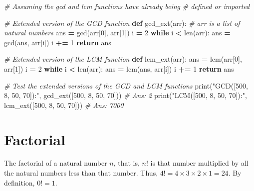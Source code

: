\documentclass[
]{book}
\newenvironment{Shaded}{\begin{snugshade}}{\end{snugshade}}
\newcommand{\BuiltInTok}[1]{#1}
\newcommand{\CommentTok}[1]{\textcolor[rgb]{0.56,0.35,0.01}{\textit{#1}}}
\newcommand{\ControlFlowTok}[1]{\textcolor[rgb]{0.13,0.29,0.53}{\textbf{#1}}}
\newcommand{\DecValTok}[1]{\textcolor[rgb]{0.00,0.00,0.81}{#1}}
\newcommand{\KeywordTok}[1]{\textcolor[rgb]{0.13,0.29,0.53}{\textbf{#1}}}
\newcommand{\NormalTok}[1]{#1}
\newcommand{\OperatorTok}[1]{\textcolor[rgb]{0.81,0.36,0.00}{\textbf{#1}}}
\newcommand{\StringTok}[1]{\textcolor[rgb]{0.31,0.60,0.02}{#1}}
\begin{document}
\begin{Shaded}
\begin{Highlighting}[]
\CommentTok{\# Assuming the gcd and lcm functions have already being}
\CommentTok{\# defined or imported}

\CommentTok{\# Extended version of the GCD function}
\KeywordTok{def}\NormalTok{ gcd\_ext(arr):}
    \CommentTok{\# arr is a list of natural numbers}
\NormalTok{    ans }\OperatorTok{=}\NormalTok{ gcd(arr[}\DecValTok{0}\NormalTok{], arr[}\DecValTok{1}\NormalTok{])}
\NormalTok{    i }\OperatorTok{=} \DecValTok{2}
    \ControlFlowTok{while}\NormalTok{ i }\OperatorTok{\textless{}} \BuiltInTok{len}\NormalTok{(arr):}
\NormalTok{        ans }\OperatorTok{=}\NormalTok{ gcd(ans, arr[i])}
\NormalTok{        i }\OperatorTok{+=} \DecValTok{1}
    \ControlFlowTok{return}\NormalTok{ ans}
    
\CommentTok{\# Extended version of the LCM function}
\KeywordTok{def}\NormalTok{ lcm\_ext(arr):}
\NormalTok{    ans }\OperatorTok{=}\NormalTok{ lcm(arr[}\DecValTok{0}\NormalTok{], arr[}\DecValTok{1}\NormalTok{])}
\NormalTok{    i }\OperatorTok{=} \DecValTok{2}
    \ControlFlowTok{while}\NormalTok{ i }\OperatorTok{\textless{}} \BuiltInTok{len}\NormalTok{(arr):}
\NormalTok{        ans }\OperatorTok{=}\NormalTok{ lcm(ans, arr[i])}
\NormalTok{        i }\OperatorTok{+=} \DecValTok{1}
    \ControlFlowTok{return}\NormalTok{ ans}
    
\CommentTok{\# Test the extended versions of the GCD and LCM functions}
\BuiltInTok{print}\NormalTok{(}\StringTok{"GCD([500, 8, 50, 70]):"}\NormalTok{, gcd\_ext([}\DecValTok{500}\NormalTok{, }\DecValTok{8}\NormalTok{, }\DecValTok{50}\NormalTok{, }\DecValTok{70}\NormalTok{]))  }\CommentTok{\# Ans: 2}
\BuiltInTok{print}\NormalTok{(}\StringTok{"LCM([500, 8, 50, 70]):"}\NormalTok{, lcm\_ext([}\DecValTok{500}\NormalTok{, }\DecValTok{8}\NormalTok{, }\DecValTok{50}\NormalTok{, }\DecValTok{70}\NormalTok{]))  }\CommentTok{\# Ans: 7000}
\end{Highlighting}
\end{Shaded}

\chapter{Factorial}\label{factorial}

The factorial of a natural number \(n\), that is, \(n!\) is that number multiplied by all the natural numbers less than that number. Thus, \(4! = 4 \times 3 \times 2 \times 1 = 24\). By definition, \(0! = 1\).
\end{document}
